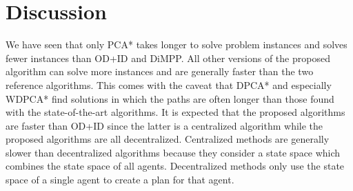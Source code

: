 \section{Discussion}\label{sec:discussion}


We have seen that only PCA* takes longer to solve problem instances and solves
fewer instances than OD+ID and DiMPP. All other versions of the proposed
algorithm can solve more
instances and are generally faster than the two reference algorithms. This
comes with the caveat that DPCA* and especially WDPCA* find solutions in which
the paths are often longer than those found with the state-of-the-art
algorithms. It is expected that the proposed algorithms are faster than OD+ID
since the latter is a centralized algorithm while the proposed algorithms are
all decentralized. Centralized methods are generally slower than decentralized
algorithms because they consider a state space which combines the state space
of all agents. Decentralized methods only use the state space of a single agent
to create a plan for that agent.

